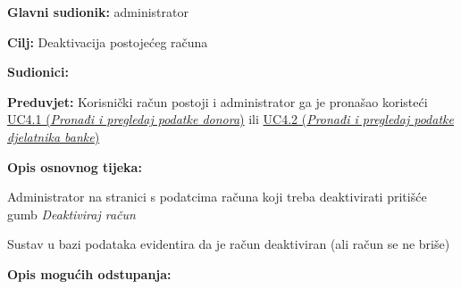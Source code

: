 					
					\noindent {}
					\begin{packed_item} \label{5.3}
	
						\item \textbf{Glavni sudionik: }administrator
						\item  \textbf{Cilj:} Deaktivacija postojećeg računa 
						\item  \textbf{Sudionici:} 
						\item  \textbf{Preduvjet:} Korisnički račun postoji i administrator ga je pronašao koristeći \hyperref[UC4.1]{UC4.1 (\textit{Pronađi i pregledaj podatke donora})} ili \hyperref[UC4.2]{UC4.2 (\textit{Pronađi i pregledaj podatke djelatnika banke})}
						\item  \textbf{Opis osnovnog tijeka:}
						
						\item[] \begin{packed_enum}
	
							\item Administrator na stranici s podatcima računa koji treba deaktivirati pritišće gumb \textit{Deaktiviraj račun}
	                        \item Sustav u bazi podataka evidentira da je račun deaktiviran (ali račun se ne briše)

						\end{packed_enum}
						
						\item  \textbf{Opis mogućih odstupanja:}
						
					\end{packed_item}
					
